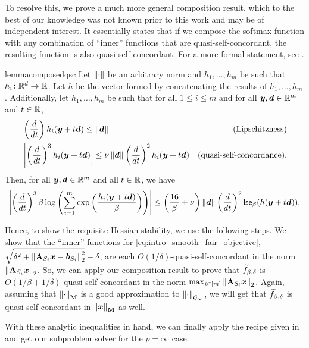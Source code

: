 To resolve this, we prove a much more general composition result, which to the best of our knowledge was not known prior to this work and may be of independent interest. It essentially states that if we compose the softmax function with any combination of ``inner'' functions that are quasi-self-concordant, the resulting function is also quasi-self-concordant. For a more formal statement, see . 

\begin{restatable*}{lemma}{composedqsc}
\label{lemma:composed_qsc}
Let $\left\lVert \cdot \right\rVert$ be an arbitrary norm and $h_1,\dots,h_m$ be such that $h_i\colon\mathbb{R}^d\rightarrow\mathbb{R}$. Let $h$ be the vector formed by concatenating the results of $h_1, \dots, h_m$. Additionally, let $h_1, \dots, h_m$ be such that for all $1 \le i \le m$ and for all $\bm{y},\bm{d}\in\mathbb{R}^m$ and $t\in\mathbb{R}$,
\begin{align*}
    &\left(\frac{d}{dt}\right) h_i(\bm{y} + t\bm{d}) \le \left\lVert \bm{d} \right\rVert & \text{(Lipschitzness)}\\
    &\left\lvert \left(\frac{d}{dt}\right)^3 h_i(\bm{y} + t\bm{d}) \right\rvert \le \nu\left\lVert \bm{d} \right\rVert\left(\frac{d}{dt}\right)^2 h_i(\bm{y} + t\bm{d}) & \text{(quasi-self-concordance)}.
\end{align*}
Then, for all $\bm{y},\bm{d}\in\mathbb{R}^m$ and all $t\in\mathbb{R}$, we have
\begin{align*}
    \left\lvert \left(\frac{d}{dt}\right)^3 \beta\log\left(\sum_{i=1}^m \mathrm{exp}\left(\frac{h_i(\bm{y}+t\bm{d})}{\beta}\right)\right) \right\rvert \le \left(\frac{16}{\beta}+\nu\right)\left\lVert \bm{d} \right\rVert\left(\frac{d}{dt}\right)^2 \mathsf{lse}_{\beta}(h(\bm{y} + t\bm{d})).
\end{align*}
\end{restatable*}

Hence, to show the requisite Hessian stability, we use the following steps. We show that the ``inner'' functions for \eqref{eq:intro_smooth_fair_objective}, $\sqrt{\delta^2+\left\lVert \mathbf{A}_{S_i}\bm{x}-\bm{b}_{S_i} \right\rVert_2^2}-\delta$, are each $O(1/\delta)$-quasi-self-concordant in the norm $\left\lVert \mathbf{A}_{S_i}\bm{x} \right\rVert_2$. So, we can apply our composition result  to prove that $\widetilde{f}_{\beta,\delta}$ is $O(1/\beta + 1/\delta)$-quasi-self-concordant in the norm $\max_{i\in[m]}\left\lVert \mathbf{A}_{S_i}\bm{x} \right\rVert_2$. Again, assuming that $\left\lVert \cdot \right\rVert_{\mathbf{M}}$ is a good approximation to $\left\lVert \cdot \right\rVert_{\mathcal{G}_{\infty}}$, we will get that $\widetilde{f}_{\beta,\delta}$ is quasi-self-concordant in $\left\lVert \bm{x} \right\rVert_{\mathbf{M}}$ as well. 

With these analytic inequalities in hand, we can finally apply the recipe given in \cite{msbacon} and get our subproblem solver for the $p=\infty$ case.

